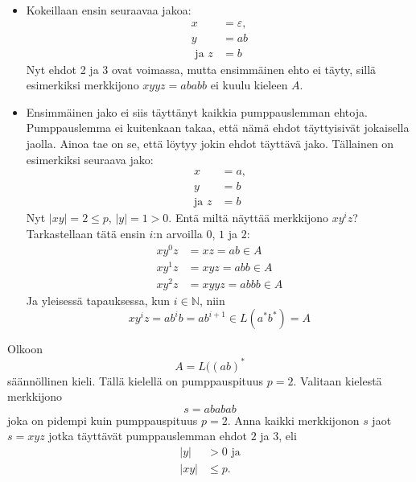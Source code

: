 \documentclass[a4paper,11pt]{article}
\theoremstyle{definition}
\newcommand{\Nat}{\mathbb{N}}
\begin{document}
\begin{itemize}
    \item Kokeillaan ensin seuraavaa jakoa:
        \begin{align*}
             x               & = \varepsilon,  \\
             y               & = ab            \\
            \textrm{ ja }  z & = b
        \end{align*}
        Nyt ehdot 2 ja 3 ovat voimassa, mutta ensimmäinen ehto ei täyty, sillä
        esimerkiksi merkkijono $xyyz = ababb$ ei kuulu kieleen $A$.

    \item Ensimmäinen jako ei siis täyttänyt kaikkia pumppauslemman ehtoja.
        Pumppauslemma ei kuitenkaan takaa, että nämä ehdot täyttyisivät
        jokaisella jaolla. Ainoa tae on se, että löytyy jokin ehdot täyttävä
        jako. Tällainen on esimerkiksi seuraava jako:
        \begin{align*}
            x              & = a \textrm{,} \\
            y              & = b \\
            \textrm{ja } z & = b
        \end{align*}
        Nyt $|xy| = 2 \leq p$, $|y| = 1 > 0$. Entä miltä näyttää merkkijono
        $xy^iz$? Tarkastellaan tätä ensin $i$:n arvoilla $0$, $1$ ja $2$:
        \begin{align*}
            xy^0z & = xz  = ab \in A \\
            xy^1z & = xyz = abb \in A \\
            xy^2z & = xyyz = abbb \in A
        \end{align*}
        Ja yleisessä tapauksessa, kun $i \in \Nat$, niin
        \begin{equation*}
            xy^iz = ab^ib = ab^{i+1} \in L(a^*b^*) = A
        \end{equation*}
\end{itemize}

\begin{exercise}
    Olkoon
    \begin{equation*}
        A = L((ab)^*
    \end{equation*}
    säännöllinen kieli. Tällä kielellä on pumppauspituus $p = 2$. Valitaan
    kielestä merkkijono
    \begin{equation*}
        s = ababab
    \end{equation*}
    joka on pidempi kuin pumppauspituus $p = 2$.  Anna kaikki merkkijonon $s$
    jaot $s = xyz$ jotka täyttävät pumppauslemman ehdot $2$ ja $3$, eli 
    \begin{align*}
        |y|  & > 0 \textrm{ ja} \\
        |xy| & \leq p \text{.}
    \end{align*}
\end{exercise}
\end{document}
